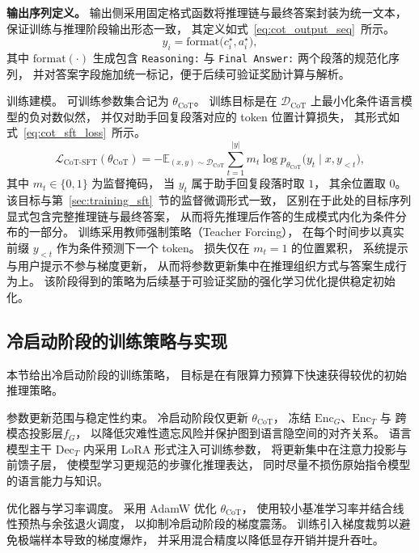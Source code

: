 \textbf{输出序列定义。}
输出侧采用固定格式函数将推理链与最终答案封装为统一文本，
保证训练与推理阶段输出形态一致，
其定义如式~\ref{eq:cot_output_seq}\ 所示。
\begin{equation}
  y_i
  =
  \mathrm{format}\big(c_i^\star,a_i^\star\big),
  \label{eq:cot_output_seq}
\end{equation}
其中 $\mathrm{format}(\cdot)$ 生成包含 \texttt{Reasoning:} 与 \texttt{Final Answer:} 两个段落的规范化序列，
并对答案字段施加统一标记，便于后续可验证奖励计算与解析。

{训练建模。}
可训练参数集合记为 $\theta_{\mathrm{CoT}}$。
训练目标是在 $\mathcal{D}_{\mathrm{CoT}}$ 上最小化条件语言模型的负对数似然，
并仅对助手回复段落对应的 token 位置计算损失，
其形式如式~\ref{eq:cot_sft_loss}\ 所示。
\begin{equation}
  \mathcal{L}_{\mathrm{CoT\text{-}SFT}}(\theta_{\mathrm{CoT}})
  =
  - \mathbb{E}_{(x,y)\sim\mathcal{D}_{\mathrm{CoT}}}
  \sum_{t=1}^{|y|}
  m_t
  \log p_{\theta_{\mathrm{CoT}}}\big(y_t \mid x, y_{<t}\big),
  \label{eq:cot_sft_loss}
\end{equation}
其中 $m_t\in\{0,1\}$ 为监督掩码，
当 $y_t$ 属于助手回复段落时取 $1$，
其余位置取 $0$。
该目标与第~\ref{sec:training_sft}\ 节的监督微调形式一致，
区别在于此处的目标序列显式包含完整推理链与最终答案，
从而将先推理后作答的生成模式内化为条件分布的一部分。
训练采用教师强制策略（Teacher Forcing），
在每个时间步以真实前缀 $y_{<t}$ 作为条件预测下一个 token。
损失仅在 $m_t=1$ 的位置累积，
系统提示与用户提示不参与梯度更新，
从而将参数更新集中在推理组织方式与答案生成行为上。
该阶段得到的策略为后续基于可验证奖励的强化学习优化提供稳定初始化。
\subsection{冷启动阶段的训练策略与实现}
\label{subsec:cot_sft_train_detail}

本节给出冷启动阶段的训练策略，
目标是在有限算力预算下快速获得较优的初始推理策略。

{参数更新范围与稳定性约束。}
冷启动阶段仅更新 $\theta_{\mathrm{CoT}}$，
冻结 $\mathrm{Enc}_G$、$\mathrm{Enc}_T$ 与
跨模态投影层\(f_G\)，
以降低灾难性遗忘风险并保护图到语言隐空间的对齐关系。
语言模型主干 $\mathrm{Dec}_T$ 内采用 LoRA 形式注入可训练参数，
将更新集中在注意力投影与前馈子层，
使模型学习更规范的步骤化推理表达，
同时尽量不损伤原始指令模型的语言能力与知识。

{优化器与学习率调度。}
采用 AdamW 优化 $\theta_{\mathrm{CoT}}$，
使用较小基准学习率并结合线性预热与余弦退火调度，
以抑制冷启动阶段的梯度震荡。
训练引入梯度裁剪以避免极端样本导致的梯度爆炸，
并采用混合精度以降低显存开销并提升吞吐。

